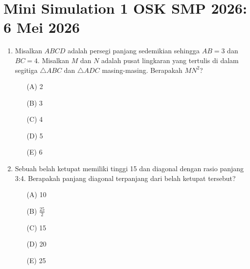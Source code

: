 \documentclass[12pt]{scrartcl}
\begin{document}
\renewcommand*\contentsname{Daftar Isi}
\tableofcontents

\newpage

\section*{Mini Simulation 1 OSK SMP 2026: 6 Mei 2026}

\begin{enumerate}
    \item Misalkan $ABCD$ adalah persegi panjang sedemikian sehingga $AB=3$ dan $BC=4$. Misalkan $M$ dan $N$ adalah pusat lingkaran yang tertulis di dalam segitiga $\triangle ABC$ dan $\triangle ADC$ masing-masing. Berapakah $MN^{2}$?
        \begin{center}
    \end{center}
    \begin{itemize}
        \item[(A)] 2
        \item[(B)] 3
        \item[(C)] 4
        \item[(D)] 5
        \item[(E)] 6
    \end{itemize}

    \item Sebuah belah ketupat memiliki tinggi 15 dan diagonal dengan rasio panjang 3:4. Berapakah panjang diagonal terpanjang dari belah ketupat tersebut?
    \begin{itemize}
        \item[(A)] 10
        \item[(B)] $\frac{25}{2}$
        \item[(C)] 15
        \item[(D)] 20
        \item[(E)] 25
    \end{itemize}


\end{enumerate}
\end{document}
